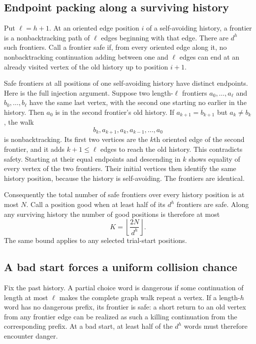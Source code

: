 \documentclass[11pt]{article}
\theoremstyle{definition}
\begin{document}
\subsection{Endpoint packing along a surviving history}

Put $\ell=h+1$. At an oriented edge position $i$ of a self-avoiding history,
a frontier is a nonbacktracking path of $\ell$ edges beginning with that
edge. There are $d^h$ such frontiers. Call a frontier safe if, from every
oriented edge along it, no nonbacktracking continuation adding between
one and $\ell$ edges can end at an already visited vertex of the old
history up to position $i+1$.

Safe frontiers at all positions of one self-avoiding history have distinct
endpoints. Here is the full injection argument. Suppose two length-$\ell$
frontiers $a_0,\ldots,a_\ell$ and $b_0,\ldots,b_\ell$ have the same
last vertex, with the second one starting no earlier in the history.
Then $a_0$ is in the second frontier's old history. If
$a_{k+1}=b_{k+1}$ but $a_k\ne b_k$, the walk
\[
 b_k,a_{k+1},a_k,a_{k-1},\ldots,a_0
\]
is nonbacktracking. Its first two vertices are the $k$th oriented edge
of the second frontier, and it adds $k+1\le\ell$ edges to reach the
old history. This contradicts safety. Starting at their equal endpoints
and descending in $k$ shows equality of every vertex of the two frontiers.
Their initial vertices then identify the same history position, because
the history is self-avoiding. The frontiers are identical.

Consequently the total number of safe frontiers over every history position
is at most $N$. Call a position good when at least half of its $d^h$
frontiers are safe. Along any surviving history the number of good positions
is therefore at most
\begin{equation}\label{eq:goodbudget}
 K=\left\lfloor\frac{2N}{d^h}\right\rfloor.
\end{equation}
The same bound applies to any selected trial-start positions.

\subsection{A bad start forces a uniform collision chance}

Fix the past history. A partial choice word is dangerous if some continuation
of length at most $\ell$ makes the complete graph walk repeat a vertex.
If a length-$h$ word has no dangerous prefix, its frontier is safe: a
short return to an old vertex from any frontier edge can be realized as
such a killing continuation from the corresponding prefix. At a bad start,
at least half of the $d^h$ words must therefore encounter danger.
\end{document}
